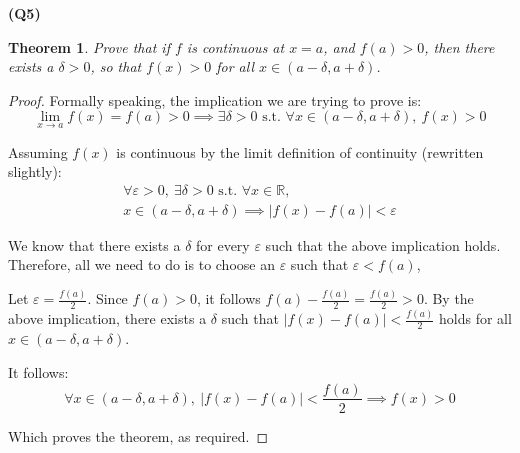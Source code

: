 \documentclass[12pt, a4paper]{article}
\renewcommand{\epsilon}{\varepsilon}
\newcommand{\displim}[1]{\displaystyle{\lim_{#1}}}
\newcommand{\st}{\text{ s.t. }}
\newcommand{\R}{\mathbb{R}}
\newtheorem{theorem}{Theorem}
\begin{document}
\textbf{(Q5)}

\begin{theorem}
    Prove that if $f$ is continuous at $x = a$, and $f(a) > 0$, then there exists
    a $\delta > 0$, so that $f(x) > 0$ for all $x \in (a - \delta, a + \delta)$.
\end{theorem}

\begin{proof}
    Formally speaking, the implication we are trying to prove is:
    \[
        \displim{x \to a} f(x) = f(a) > 0 \implies \exists \delta > 0 \st \forall
        x \in (a - \delta, a + \delta), \: f(x) > 0
    \]

    Assuming $f(x)$ is continuous by the limit definition of continuity (rewritten slightly):
    \begin{gather*}
        \forall \epsilon > 0, \: \exists \delta > 0 \st \forall x \in \R,\\
        x \in (a - \delta, a + \delta) \implies |f(x) - f(a)| < \epsilon
    \end{gather*}

    We know that there exists a $\delta$ for every $\epsilon$ such that the above implication
    holds. Therefore, all we need to do is to choose an $\epsilon$ such that $\epsilon < f(a)$,

    Let $\epsilon = \frac{f(a)}{2}$. Since $f(a) > 0$, it follows
    $f(a) - \frac{f(a)}{2} = \frac{f(a)}{2} > 0$. By the above implication, there exists
    a $\delta$ such that $|f(x) - f(a)| < \frac{f(a)}{2}$ holds for all $x \in (a - \delta, a + \delta)$.

    It follows:
    \[
        \forall x \in (a - \delta, a + \delta), \:|f(x) - f(a)| < \frac{f(a)}{2} \implies f(x) > 0
    \]

    Which proves the theorem, as required.
\end{proof}
\end{document}
